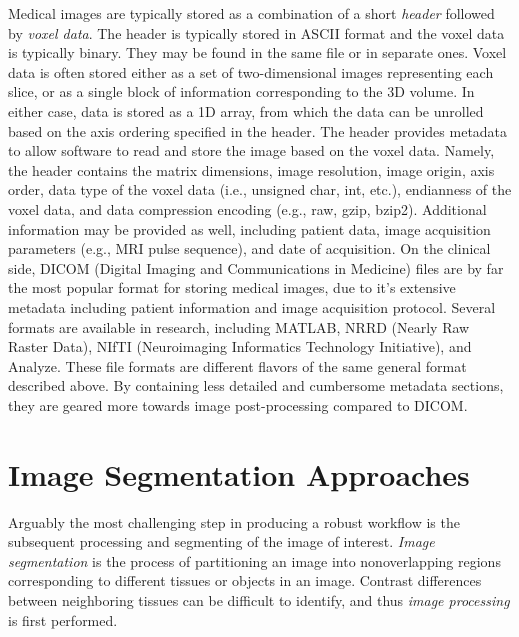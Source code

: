 Medical images are typically stored as a combination of a short \textit{header} followed by \textit{voxel data}. The header is typically stored in ASCII format and the voxel data is typically binary. They may be found in the same file or in separate ones. Voxel data is often stored either as a set of two-dimensional images representing each slice, or as a single block of information corresponding to the 3D volume. In either case, data is stored as a 1D array, from which the data can be unrolled based on the axis ordering specified in the header. The header provides metadata to allow software to read and store the image based on the voxel data. Namely, the header contains the matrix dimensions, image resolution, image origin, axis order, data type of the voxel data (i.e., unsigned char, int, etc.), endianness of the voxel data, and data compression encoding (e.g., raw, gzip, bzip2). Additional information may be provided as well, including patient data, image acquisition parameters (e.g., MRI pulse sequence), and date of acquisition. On the clinical side, DICOM (Digital Imaging and Communications in Medicine) files are by far the most popular format for storing medical images, due to it's extensive metadata including patient information and image acquisition protocol. Several formats are available in research, including MATLAB, NRRD (Nearly Raw Raster Data), NIfTI (Neuroimaging Informatics Technology Initiative), and Analyze. These file formats are different flavors of the same general format described above. By containing less detailed and cumbersome metadata sections, they are geared more towards image post-processing compared to DICOM.

\section{Image Segmentation Approaches}
\label{Image Segmentation Approaches}

Arguably the most challenging step in producing a robust workflow is the subsequent processing and segmenting of the image of interest. \textit{Image segmentation} is the process of partitioning an image into nonoverlapping regions corresponding to different tissues or objects in an image. Contrast differences between neighboring tissues can be difficult to identify, and thus \textit{image processing} is first performed.

